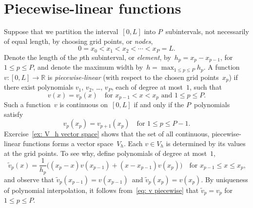 \section{Piecewise-linear functions}
Suppose that we partition the interval~$[0,L]$ into $P$~subintervals, not 
necessarily of equal length, by choosing grid points, or \emph{nodes},
\begin{equation}\label{eq: 1d nodes}
0=x_0<x_1<x_2<\cdots<x_P=L.
\end{equation}
Denote the length of the $p$th subinterval, or \emph{element}, 
by~$h_p=x_p-x_{p-1}$, for~$1\le p\le P$, and denote the maximum width 
by~$h=\max_{1\le p\le P}h_p$.  A function $v:[0,L]\to\mathbb{R}$ is 
\emph{piecewise-linear} (with respect to the chosen grid points~$x_p$) if 
there exist polynomials $v_1$, $v_2$, \dots, $v_P$, each of degree at most~$1$, 
such that
\begin{equation}\label{eq: v piecewise}
v(x)=v_p(x)\quad\text{for $x_{p-1}<x<x_p$ and $1\le p\le P$.}
\end{equation}
Such a function~$v$ is continuous on~$[0,L]$ if and only if the $P$~polynomials 
satisfy
\begin{equation}\label{eq: v cts}
v_p(x_p)=v_{p+1}(x_p)\quad\text{for $1\le p\le P-1$.}
\end{equation}
Exercise~\ref{ex: V_h vector space} shows that the set of all continuous, 
piecewise-linear functions forms a vector space~$V_h$.  Each $v\in V_h$ is 
determined by its values at the grid points.  To see why, define polynomials
of degree at most~$1$,
\begin{equation}\label{eq: piecewise linear v}
\tilde v_p(x)=\frac{1}{h_p}\bigl((x_p-x)v(x_{p-1})+(x-x_{p-1})v(x_p)\bigr)
    \quad\text{for $x_{p-1}\le x\le x_p$,}
\end{equation}
and observe that $\tilde v_p(x_{p-1})=v(x_{p-1})$~and $\tilde v_p(x_p)=v(x_p)$. 
By uniqueness of polynomial interpolation, it follows 
from~\eqref{eq: v piecewise} that $\tilde v_p=v_p$ for~$1\le p\le P$.

